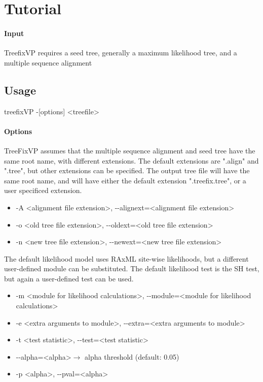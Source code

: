 \documentclass[12pt]{article}
\begin{document}
\section{Tutorial}
\paragraph{Input}
TreefixVP requires a seed tree, generally a maximum likelihood tree, and a multiple sequence alignment

\subsection{Usage}
treefixVP -[options] \textless treefile\textgreater

\paragraph{Options}
TreeFixVP assumes that the multiple sequence alignment and seed tree have the same root name, with
different extensions. The default extensions are ".align" and ".tree", but other extensions can be specified.
The output tree file will have the same root name, and will have either the default extension
".treefix.tree", or a user specificed extension.

\begin{itemize}
    \item -A \textless alignment file extension\textgreater, -{}-alignext=\textless alignment file extension\textgreater
    \item -o \textless old tree file extension\textgreater, -{}-oldext=\textless old tree file extension\textgreater
    \item -n \textless new tree file extension\textgreater, -{}-newext=\textless new tree file extension\textgreater
\end{itemize}

The default likelihood model uses RAxML site-wise likelihoods, but a different user-defined
module can be substituted. The default likelihood test is the SH test, but again a user-defined
test can be used. 

\begin{itemize}
    \item -m \textless module for likelihood calculations\textgreater, -{}-module=\textless module for likelihood calculations\textgreater
    \item -e \textless extra arguments to module\textgreater, -{}-extra=\textless extra arguments to module\textgreater
    \item -t \textless test statistic\textgreater, -{}-test=\textless test statistic\textgreater
    \item -{}-alpha=\textless alpha\textgreater $\rightarrow$ alpha threshold (default: 0.05)
    \item -p \textless alpha\textgreater, -{}-pval=\textless alpha\textgreater
\end{itemize}
\end{document}
